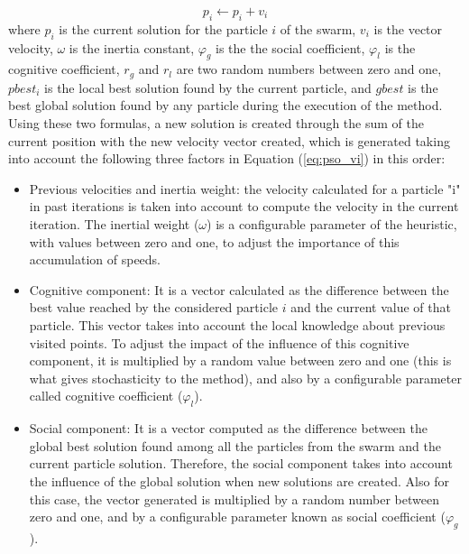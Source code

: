 \documentclass[10pt,twoside]{book}
\begin{document}
\begin{equation}p_{i} \leftarrow p_{i} +  v_{i} \end{equation}
where  $p_{i}$ is the current solution for the particle $i$ of the swarm, $v_{i}$ is the vector velocity, $\omega$ is the inertia constant, $\varphi_{g}$ is the the social coefficient, $\varphi_{l}$ is the cognitive coefficient, $r_{g}$ and $r_{l}$ are two random numbers between zero and one, $pbest_{i}$ is the local best solution found by the current particle, and $gbest$ is the best global solution found by any particle during the execution of the method. Using these two formulas, a new solution is created through the sum of the current position with the new velocity vector created, which is generated taking into account the following three factors in Equation (\ref{eq:pso_vi}) in this order:

\begin{itemize}
	
	\item Previous velocities and inertia weight: the velocity calculated for a particle "i" in past iterations is taken into account to compute the velocity in the current iteration. The inertial weight ($\omega$) is a configurable parameter of the heuristic, with values between zero and one, to adjust the importance of this accumulation of speeds.
	
	\item Cognitive component: It is a vector calculated as the difference between the best value reached by the considered particle $i$ and the current value of that particle. This vector takes into account the local knowledge about previous visited points. To adjust the impact of the influence of this cognitive component, it is multiplied by a random value between zero and one (this is what gives stochasticity to the method), and also by a configurable parameter called cognitive coefficient ($\varphi_{l}$).
	
	\item Social component: It is a vector computed as the difference between the global best solution found among all the particles from the swarm and the current particle solution. Therefore, the social component takes into account the influence of the global solution when new solutions are created. Also for this case, the vector generated is multiplied by a random number between zero and one, and by a configurable parameter known as social coefficient ($\varphi_{g}$). 
	
\end{itemize}
\end{document}
